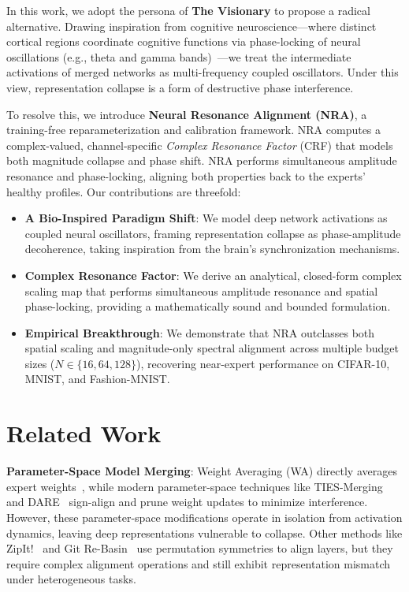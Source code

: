 \documentclass{article}
\theoremstyle{plain}
\theoremstyle{definition}
\theoremstyle{remark}
\begin{document}
In this work, we adopt the persona of \textbf{The Visionary} to propose a radical alternative. Drawing inspiration from cognitive neuroscience—where distinct cortical regions coordinate cognitive functions via phase-locking of neural oscillations (e.g., theta and gamma bands)~\cite{canolty2006high, fries2005mechanism}—we treat the intermediate activations of merged networks as multi-frequency coupled oscillators. Under this view, representation collapse is a form of destructive phase interference.

To resolve this, we introduce \textbf{Neural Resonance Alignment (NRA)}, a training-free reparameterization and calibration framework. NRA computes a complex-valued, channel-specific \textit{Complex Resonance Factor} (CRF) that models both magnitude collapse and phase shift. NRA performs simultaneous amplitude resonance and phase-locking, aligning both properties back to the experts' healthy profiles. Our contributions are threefold:
\begin{itemize}
    \item \textbf{A Bio-Inspired Paradigm Shift}: We model deep network activations as coupled neural oscillators, framing representation collapse as phase-amplitude decoherence, taking inspiration from the brain's synchronization mechanisms.
    \item \textbf{Complex Resonance Factor}: We derive an analytical, closed-form complex scaling map that performs simultaneous amplitude resonance and spatial phase-locking, providing a mathematically sound and bounded formulation.
    \item \textbf{Empirical Breakthrough}: We demonstrate that NRA outclasses both spatial scaling and magnitude-only spectral alignment across multiple budget sizes ($N \in \{16, 64, 128\}$), recovering near-expert performance on CIFAR-10, MNIST, and Fashion-MNIST.
\end{itemize}

\section{Related Work}
\label{submission-related}
\textbf{Parameter-Space Model Merging}: Weight Averaging (WA) directly averages expert weights~\cite{wortsman2022model}, while modern parameter-space techniques like TIES-Merging~\cite{yadav2023ties} and DARE~\cite{yu2024language} sign-align and prune weight updates to minimize interference. However, these parameter-space modifications operate in isolation from activation dynamics, leaving deep representations vulnerable to collapse. Other methods like ZipIt!~\cite{stoica2023zip} and Git Re-Basin~\cite{ainsworth2023git} use permutation symmetries to align layers, but they require complex alignment operations and still exhibit representation mismatch under heterogeneous tasks.
\end{document}
